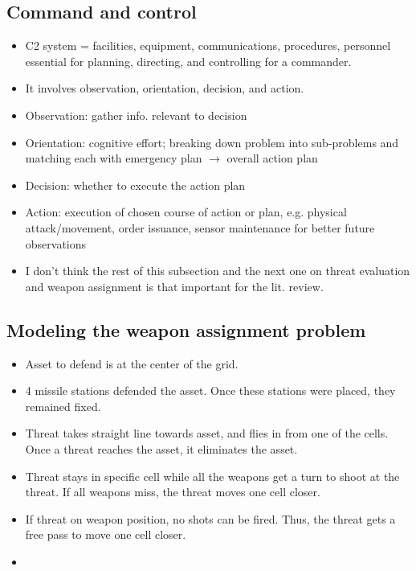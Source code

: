 \documentclass[12pt]{article} %
\begin{document}
\subsection*{Command and control}
\begin{itemize}
\item C2 system = facilities, equipment, communications, procedures, personnel essential for planning, directing, and controlling 
for a commander.
\item It involves observation, orientation, decision, and action. 
\item Observation: gather info. relevant to decision
\item Orientation: cognitive effort; breaking down problem into sub-problems and matching each with emergency plan $\rightarrow$ overall action plan 
\item Decision: whether to execute the action plan 
\item Action: execution of chosen course of action or plan, e.g. physical attack/movement, order issuance, sensor maintenance for better future observations
\item I don't think the rest of this subsection and the next one on threat evaluation and weapon assignment is that important for the lit. review.
\end{itemize}

\subsection*{Modeling the weapon assignment problem}
\begin{itemize}
    \item Asset to defend is at the center of the grid.
    \item 4 missile stations defended the asset. Once these stations were placed, they remained fixed.
    \item Threat takes straight line towards asset, and flies in from one of the cells. Once a threat reaches the asset, it eliminates the asset.
    \item Threat stays in specific cell while all the weapons get a turn to shoot at the threat. If all weapons miss, the threat moves one cell closer.
    \item If threat on weapon position, no shots can be fired. Thus, the threat gets a free pass to move one cell closer.
    \item 
\end{itemize}
\end{document}
